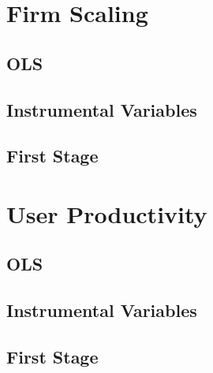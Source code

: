 \documentclass{article}
\newcommand{\cleanedresultsdir}{../results/cleaned}
\begin{document}
\clearpage
\section{Firm Scaling}
\label{sec:firm_scaling}

\subsection{OLS}


\subsection{Instrumental Variables}


\subsection{First Stage}



\clearpage
\section{User Productivity}
\label{sec:user_productivity}

\subsection{OLS}


\subsection{Instrumental Variables}


\subsection{First Stage}


\end{document}
